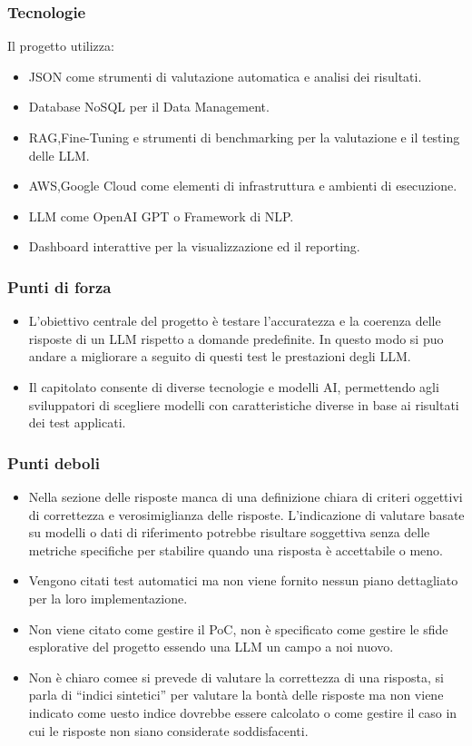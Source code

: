     \subsubsection{Tecnologie}
    Il progetto utilizza:

\begin{itemize}
    \item JSON come strumenti di valutazione automatica e analisi dei risultati.
    \item Database NoSQL per il Data Management.
    \item RAG,Fine-Tuning e strumenti di benchmarking per la valutazione e il testing delle LLM.
    \item AWS,Google Cloud come elementi di infrastruttura e ambienti di esecuzione.
    \item LLM come OpenAI GPT o Framework di NLP.
    \item Dashboard interattive per la visualizzazione ed il reporting.
\end{itemize}
    \subsubsection{Punti di forza}
    \begin{itemize}
    \item L’obiettivo centrale del progetto è testare l’accuratezza e la coerenza delle risposte di un LLM rispetto a domande predefinite. In questo modo si puo andare a migliorare a seguito di questi test le prestazioni degli LLM.
    \item Il capitolato consente di diverse tecnologie e modelli AI, permettendo agli sviluppatori di scegliere modelli con caratteristiche diverse in base ai risultati dei test applicati.
\end{itemize}
    \subsubsection{Punti deboli}
    \begin{itemize}
    \item Nella sezione delle risposte manca di una definizione chiara di criteri oggettivi di correttezza e verosimiglianza delle risposte. L’indicazione di valutare basate su modelli o dati di riferimento potrebbe risultare soggettiva senza delle metriche specifiche per stabilire quando una risposta è accettabile o meno.
    \item Vengono citati test automatici ma non viene fornito nessun piano dettagliato per la loro implementazione.
    \item Non viene citato come gestire il PoC, non è specificato come gestire le sfide esplorative del progetto essendo una LLM un campo a noi nuovo.
    \item Non è chiaro comee si prevede di valutare la correttezza di una risposta, si parla di “indici sintetici” per valutare la bontà delle risposte ma non viene indicato come uesto indice dovrebbe essere calcolato o come gestire il caso in cui le risposte non siano considerate soddisfacenti.
\end{itemize}
